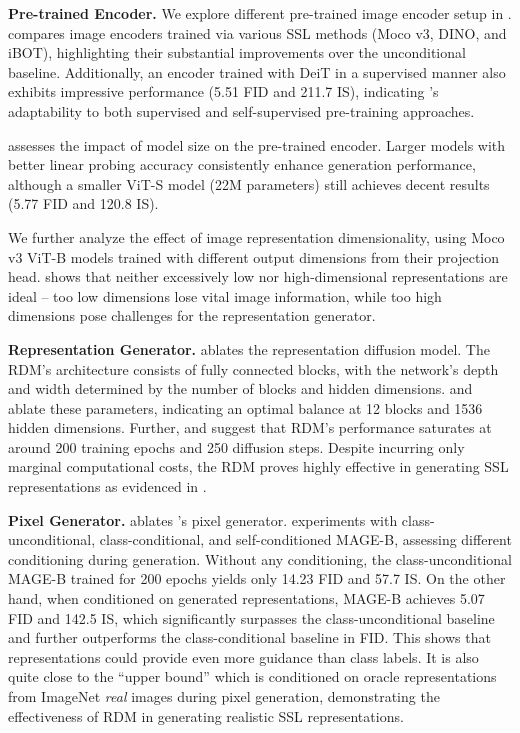 \noindent\textbf{Pre-trained Encoder.} We explore different pre-trained image encoder setup in .  compares image encoders trained via various SSL methods (Moco v3, DINO, and iBOT), highlighting their substantial improvements over the unconditional baseline. Additionally, an encoder trained with DeiT \cite{touvron2021training} in a supervised manner also exhibits impressive performance (5.51 FID and 211.7 IS), indicating \name's adaptability to both supervised and self-supervised pre-training approaches.

 assesses the impact of model size on the pre-trained encoder. Larger models with better linear probing accuracy consistently enhance generation performance, although a smaller ViT-S model (22M parameters) still achieves decent results (5.77 FID and 120.8 IS).

We further analyze the effect of image representation dimensionality, using Moco v3 ViT-B models trained with different output dimensions from their projection head.  shows that neither excessively low nor high-dimensional representations are ideal -- too low dimensions lose vital image information, while too high dimensions pose challenges for the representation generator.

\noindent\textbf{Representation Generator.}  ablates the representation diffusion model. The RDM's architecture consists of fully connected blocks, with the network's depth and width determined by the number of blocks and hidden dimensions.  and  ablate these parameters, indicating an optimal balance at 12 blocks and 1536 hidden dimensions. Further,  and  suggest that RDM's performance saturates at around 200 training epochs and 250 diffusion steps. Despite incurring only marginal computational costs, the RDM proves highly effective in generating SSL representations as evidenced in .

\noindent\textbf{Pixel Generator.}  ablates \name's pixel generator.  experiments with class-unconditional, class-conditional, and self-conditioned MAGE-B, assessing different conditioning during generation. Without any conditioning, the class-unconditional MAGE-B trained for 200 epochs yields only 14.23 FID and 57.7 IS. On the other hand, when conditioned on generated representations, MAGE-B achieves 5.07 FID and 142.5 IS, which significantly surpasses the class-unconditional baseline and further outperforms the class-conditional baseline in FID. This shows that representations could provide even more guidance than class labels. It is also quite close to the ``upper bound'' which is conditioned on oracle representations from ImageNet \textit{real} images during pixel generation, demonstrating the effectiveness of RDM in generating realistic SSL representations.

